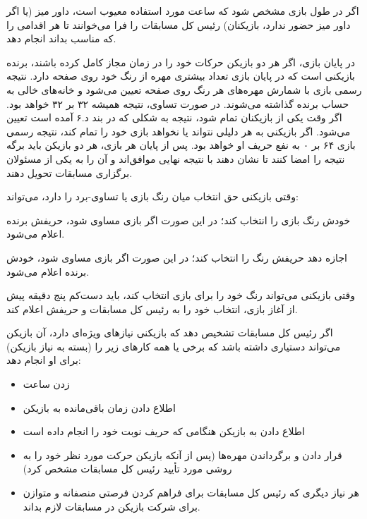 
اگر در طول بازی مشخص شود که ساعت مورد استفاده معیوب است، داور میز (یا اگر داور میز حضور ندارد، بازیکنان) رئیس کل مسابقات را فرا می‌خوانند تا هر اقدامی را که مناسب بداند انجام دهد.


در پایان بازی، اگر هر دو بازیکن حرکات خود را در زمان مجاز کامل کرده باشند، برنده بازیکنی است که در پایان بازی تعداد بیشتری مهره از رنگ خود روی صفحه دارد. نتیجه رسمی بازی با شمارش مهره‌های هر رنگ روی صفحه تعیین می‌شود و خانه‌های خالی به حساب برنده گذاشته می‌شوند. در صورت تساوی، نتیجه همیشه ۳۲ بر ۳۲ خواهد بود. اگر وقت یکی از بازیکنان تمام شود، نتیجه به شکلی که در بند د.۶ آمده است تعیین می‌شود. اگر بازیکنی به هر دلیلی نتواند یا نخواهد بازی خود را تمام کند، نتیجه رسمی بازی ۶۴ بر ۰ به نفع حریف او خواهد بود. پس از پایان هر بازی، هر دو بازیکن باید برگه نتیجه را امضا کنند تا نشان دهند با نتیجه نهایی موافق‌اند و آن را به یکی از مسئولان برگزاری مسابقات تحویل دهند.


وقتی بازیکنی حق انتخاب میان رنگ بازی یا تساوی-برد را دارد، می‌تواند:

\begin{bandha}
  \item[الف)] خودش رنگ بازی را انتخاب کند؛ در این صورت اگر بازی مساوی شود، حریفش برنده اعلام می‌شود.
  \item[ب)] اجازه دهد حریفش رنگ را انتخاب کند؛ در این صورت اگر بازی مساوی شود، خودش برنده اعلام می‌شود.
\end{bandha}

وقتی بازیکنی می‌تواند رنگ خود را برای بازی انتخاب کند، باید دست‌کم پنج دقیقه پیش از آغاز بازی، انتخاب خود را به رئیس کل مسابقات و حریفش اعلام کند.


اگر رئیس کل مسابقات تشخیص دهد که بازیکنی نیازهای ویژه‌ای دارد، آن بازیکن می‌تواند دستیاری داشته باشد که برخی یا همه کارهای زیر را (بسته به نیاز بازیکن) برای او انجام دهد:

\begin{itemize}
  \item زدن ساعت
  \item اطلاع دادن زمان باقی‌مانده به بازیکن
  \item اطلاع دادن به بازیکن هنگامی که حریف نوبت خود را انجام داده است
  \item قرار دادن و برگرداندن مهره‌ها (پس از آنکه بازیکن حرکت مورد نظر خود را به روشی مورد تأیید رئیس کل مسابقات مشخص کرد)
  \item هر نیاز دیگری که رئیس کل مسابقات برای فراهم کردن فرصتی منصفانه و متوازن برای شرکت بازیکن در مسابقات لازم بداند.
\end{itemize}


